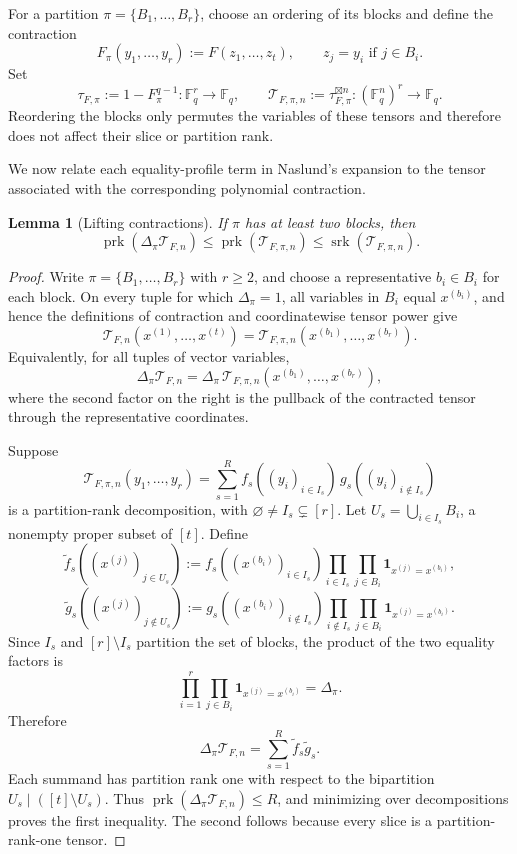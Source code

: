 \documentclass[10pt,a4paper]{amsart}
\newtheorem{lemma}[theorem]{Lemma}
\theoremstyle{definition}
\newcommand{\F}{\mathbb F}
\newcommand{\srk}{\operatorname{srk}}
\newcommand{\prk}{\operatorname{prk}}
\newcommand{\boxt}{\boxtimes}
\newcommand{\1}{\mathbf 1}
\newcommand{\Tau}{\mathcal T}
\begin{document}
For a partition $\pi=\{B_1,\ldots,B_r\}$, choose an ordering of its blocks and define the contraction
\[
 F_\pi(y_1,\ldots,y_r)
 :=F(z_1,\ldots,z_t),
 \qquad z_j=y_i\text{ if }j\in B_i.
\]
Set
\[
 \tau_{F,\pi}:=1-F_\pi^{q-1}:\F_q^r\longrightarrow\F_q,
 \qquad
 \Tau_{F,\pi,n}:=\tau_{F,\pi}^{\boxt n}:(\F_q^n)^r\longrightarrow\F_q.
\]
Reordering the blocks only permutes the variables of these tensors and therefore does not affect their slice or partition rank.

{We now relate each equality-profile term in Naslund's expansion to the
tensor associated with the corresponding polynomial contraction.}
\begin{lemma}[Lifting contractions]\label{lem:lifting}
If $\pi$ has at least two blocks, then
\[
 \prk(\Delta_\pi\Tau_{F,n})
 \le\prk(\Tau_{F,\pi,n})
 \le\srk(\Tau_{F,\pi,n}).
\]
\end{lemma}

\begin{proof}
Write $\pi=\{B_1,\ldots,B_r\}$ with $r\ge2$, and choose a representative $b_i\in B_i$ for each block.  { On every tuple for which \(\Delta_\pi=1\), all variables in \(B_i\)
equal \(x^{(b_i)}\), and hence} the definitions of contraction and coordinatewise tensor power give
\[
 \Tau_{F,n}(x^{(1)},\ldots,x^{(t)})
 =\Tau_{F,\pi,n}(x^{(b_1)},\ldots,x^{(b_r)}).
\]
Equivalently, for all tuples of vector variables,
\[
 \Delta_\pi\Tau_{F,n}
 =\Delta_\pi\,
 \Tau_{F,\pi,n}(x^{(b_1)},\ldots,x^{(b_r)}),
\]
where the second factor on the right is the pullback of the contracted tensor through the representative coordinates.

Suppose
\[
 \Tau_{F,\pi,n}(y_1,\ldots,y_r)
 =\sum_{s=1}^R
 f_s((y_i)_{i\in I_s})\,
 g_s((y_i)_{i\notin I_s})
\]
is a partition-rank decomposition, with $\varnothing\ne I_s\subsetneq[r]$.  Let
$U_s=\bigcup_{i\in I_s}B_i$, a nonempty proper subset of $[t]$.  Define
\[
 \widetilde f_s((x^{(j)})_{j\in U_s})
 :=f_s((x^{(b_i)})_{i\in I_s})
 \prod_{i\in I_s}\prod_{j\in B_i}
 \1_{x^{(j)}=x^{(b_i)}},
\]
\[
 \widetilde g_s((x^{(j)})_{j\notin U_s})
 :=g_s((x^{(b_i)})_{i\notin I_s})
 \prod_{i\notin I_s}\prod_{j\in B_i}
 \1_{x^{(j)}=x^{(b_i)}}.
\]
{ Since \(I_s\) and \([r]\setminus I_s\) partition the set of blocks,
the product of the two equality factors is
\[
 \prod_{i=1}^r\prod_{j\in B_i}
 \mathbf 1_{x^{(j)}=x^{(b_i)}}
 =\Delta_\pi.
\]}  Therefore
\[
 \Delta_\pi\Tau_{F,n}
 =\sum_{s=1}^R\widetilde f_s\widetilde g_s.
\]
Each summand has partition rank one with respect to the bipartition
$U_s\mid([t]\setminus U_s)$.  Thus
$\prk(\Delta_\pi\Tau_{F,n})\le R$, and minimizing over decompositions proves the first inequality.  The second follows because every slice is a partition-rank-one tensor.
\end{proof}
\end{document}
